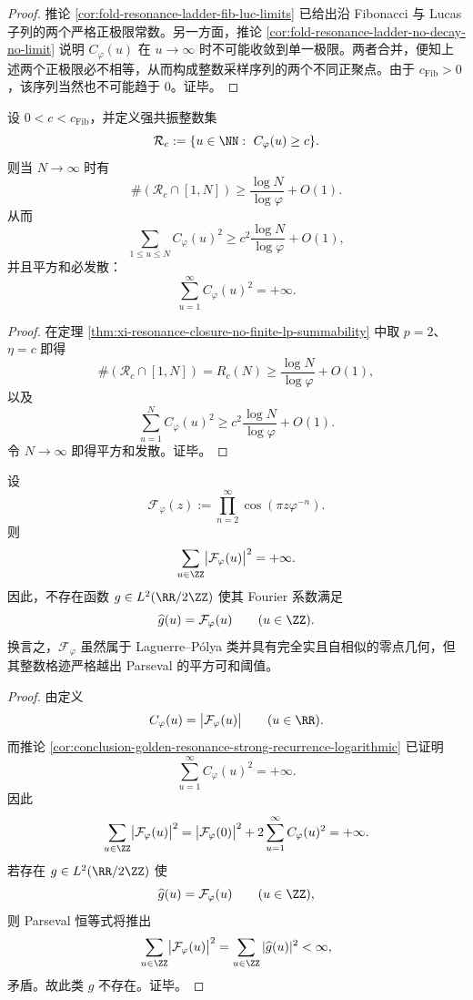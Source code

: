 \begin{proof}
推论 \ref{cor:fold-resonance-ladder-fib-luc-limits} 已给出沿 Fibonacci 与 Lucas 子列的两个严格正极限常数。另一方面，推论 \ref{cor:fold-resonance-ladder-no-decay-no-limit} 说明 \(C_\varphi(u)\) 在 \(u\to\infty\) 时不可能收敛到单一极限。两者合并，便知上述两个正极限必不相等，从而构成整数采样序列的两个不同正聚点。由于 \(c_{\mathrm{Fib}}>0\)，该序列当然也不可能趋于 \(0\)。证毕。
\end{proof}

\begin{corollary}[强共振整数集的对数级复现律]\label{cor:conclusion-golden-resonance-strong-recurrence-logarithmic}
设 \(0<c<c_{\mathrm{Fib}}\)，并定义强共振整数集
\[
\mathcal R_c:=\{u\in\NN:\ C_\varphi(u)\ge c\}.
\]
则当 \(N\to\infty\) 时有
\[
\#(\mathcal R_c\cap[1,N])
\ge
\frac{\log N}{\log\varphi}+O(1).
\]
从而
\[
\sum_{1\le u\le N}C_\varphi(u)^2
\ge
c^2\frac{\log N}{\log\varphi}+O(1),
\]
并且平方和必发散：
\[
\sum_{u=1}^{\infty}C_\varphi(u)^2=+\infty.
\]
\end{corollary}

\begin{proof}
在定理 \ref{thm:xi-resonance-closure-no-finite-lp-summability} 中取 \(p=2\)、\(\eta=c\) 即得
\[
\#(\mathcal R_c\cap[1,N])
=
R_c(N)
\ge
\frac{\log N}{\log\varphi}+O(1),
\]
以及
\[
\sum_{u=1}^{N}C_\varphi(u)^2
\ge
c^2\frac{\log N}{\log\varphi}+O(1).
\]
令 \(N\to\infty\) 即得平方和发散。证毕。
\end{proof}

\begin{theorem}\label{thm:conclusion-golden-resonance-integer-trace-not-l2}
设
\[
\mathcal F_\varphi(z):=\prod_{n=2}^{\infty}\cos(\pi z\varphi^{-n}).
\]
则
\[
\sum_{u\in \ZZ}\bigl|\mathcal F_\varphi(u)\bigr|^2=+\infty.
\]
因此，不存在函数 \(g\in L^2(\RR/2\ZZ)\) 使其 Fourier 系数满足
\[
\widehat g(u)=\mathcal F_\varphi(u)
\qquad (u\in \ZZ).
\]
换言之，\(\mathcal F_\varphi\) 虽然属于 Laguerre--P\'olya 类并具有完全实且自相似的零点几何，但其整数格迹严格越出 Parseval 的平方可和阈值。
\end{theorem}
\begin{proof}
由定义
\[
C_\varphi(u)=\bigl|\mathcal F_\varphi(u)\bigr|
\qquad (u\in \RR).
\]
而推论 \ref{cor:conclusion-golden-resonance-strong-recurrence-logarithmic} 已证明
\[
\sum_{u=1}^{\infty}C_\varphi(u)^2=+\infty.
\]
因此
\[
\sum_{u\in \ZZ}\bigl|\mathcal F_\varphi(u)\bigr|^2
=
\bigl|\mathcal F_\varphi(0)\bigr|^2
+2\sum_{u=1}^{\infty}C_\varphi(u)^2
=+\infty.
\]
若存在 \(g\in L^2(\RR/2\ZZ)\) 使
\[
\widehat g(u)=\mathcal F_\varphi(u)
\qquad (u\in \ZZ),
\]
则 Parseval 恒等式将推出
\[
\sum_{u\in \ZZ}\bigl|\mathcal F_\varphi(u)\bigr|^2
=
\sum_{u\in \ZZ}|\widehat g(u)|^2
<
\infty,
\]
矛盾。故此类 \(g\) 不存在。证毕。
\end{proof}

